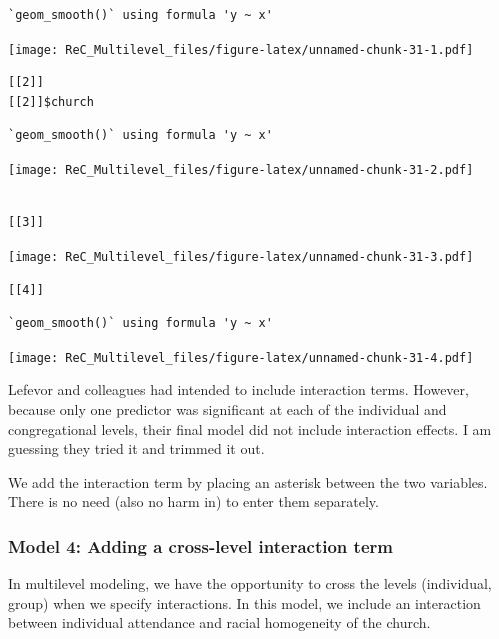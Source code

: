 \documentclass[
  11pt,
]{book}
\begin{document}
\begin{verbatim}
`geom_smooth()` using formula 'y ~ x'
\end{verbatim}

\texttt{[image: ReC\_Multilevel\_files/figure-latex/unnamed-chunk-31-1.pdf]}

\begin{verbatim}
[[2]]
[[2]]$church
\end{verbatim}

\begin{verbatim}
`geom_smooth()` using formula 'y ~ x'
\end{verbatim}

\texttt{[image: ReC\_Multilevel\_files/figure-latex/unnamed-chunk-31-2.pdf]}

\begin{verbatim}

[[3]]
\end{verbatim}

\texttt{[image: ReC\_Multilevel\_files/figure-latex/unnamed-chunk-31-3.pdf]}

\begin{verbatim}
[[4]]
\end{verbatim}

\begin{verbatim}
`geom_smooth()` using formula 'y ~ x'
\end{verbatim}

\texttt{[image: ReC\_Multilevel\_files/figure-latex/unnamed-chunk-31-4.pdf]}

Lefevor and colleagues \citep{lefevor_homonegativity_2020} had intended to include interaction terms. However, because only one predictor was significant at each of the individual and congregational levels, their final model did not include interaction effects. I am guessing they tried it and trimmed it out.

We add the interaction term by placing an asterisk between the two variables. There is no need (also no harm in) to enter them separately.

\hypertarget{model-4-adding-a-cross-level-interaction-term}{%
\subsubsection{Model 4: Adding a cross-level interaction term}\label{model-4-adding-a-cross-level-interaction-term}}

In multilevel modeling, we have the opportunity to cross the levels (individual, group) when we specify interactions. In this model, we include an interaction between individual attendance and racial homogeneity of the church.
\end{document}
